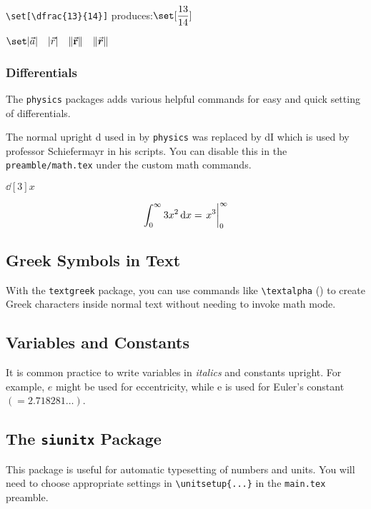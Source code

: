     \verb|\set[\dfrac{13}{14}]|     produces:$\set[\dfrac{13}{14}]$

    $\set|\vec{a}| \quad  \abs{\vec{r}} \quad \norm{\va{r}} \quad \norm{\va*{r}} $




    \subsubsection{Differentials}

    The \texttt{physics} packages adds various helpful commands for easy and quick setting of differentials.

    The normal upright d used in by \texttt{physics} was replaced by $\mathrm{d\!I}$ which is used by professor Schiefermayr in his scripts. You can disable this in the \texttt{preamble/math.tex} under the custom math commands.

     $\dd[3]{x}$

    \[ \int_{0}^{\infty} 3x^2 \dd{x} = \eval{x^3}_{0}^{\infty} \]

\subsection{Greek Symbols in Text}

    With the \verb|textgreek| package, you can use commands like \verb|\textalpha| (\textalpha) to create Greek characters inside normal text without needing to invoke math mode.

\subsection{Variables and Constants}

    It is common practice to write variables in \textit{italics} and constants upright. For example, $e$ might be used for eccentricity, while $\mathrm{e}$ is used for Euler's constant $(=\num{2.718281}\dots)$.


\subsection{The \texttt{siunitx} Package}

    This package is useful for automatic typesetting of numbers and units. You will need to choose appropriate settings in \verb|\unitsetup{...}| in the \verb|main.tex| preamble. %

